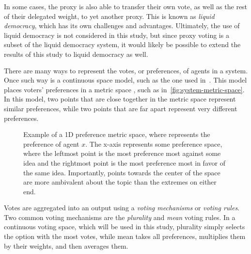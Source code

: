 In some cases, the proxy is also able to transfer their own vote, as well as the rest of
their delegated weight, to yet another proxy.
This is known as \textit{liquid democracy}, which has its own challenges and advantages.
Ultimately, the use of liquid democracy is not considered in this study, but since proxy
voting is a subset of the liquid democracy system, it would likely be possible to
extend the results of this study to liquid democracy as well.

There are many ways to represent the votes, or preferences, of agents in a system.
Once such way is a continuous space model, such as the one used in~\cite{Cohensius2017}.
This model places voters' preferences in a metric space \systemspace, such as
in~\autoref{fig:system-metric-space}.
In this model, two points that are close together in the metric space represent
similar preferences, while two points that are far apart represent very different
preferences.

\begin{figure}[htbp]
    \centering
    
    \caption{
        Example of a 1D preference metric space, where  represents the
        preference of agent $x$.
        The x-axis represents some preference space, where the leftmost point is
        the most preference most against some idea and the rightmost point is the most
        preference most in favor of the same idea.
        Importantly, points towards the center of the space are more ambivalent about
        the topic than the extremes on either end.
    }
    \label{fig:system-metric-space}
\end{figure}

Votes are aggregated into an output using a \textit{voting mechanisms} or
\textit{voting rules}.
Two common voting mechanisms are the \textit{plurality} and \textit{mean} voting rules.
In a continuous voting space, which will be used in this study, plurality simply
selects the option with the most votes, 
while mean takes all preferences, multiplies
them by their weights, and then averages them.

